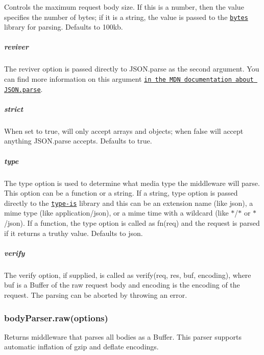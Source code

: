 Controls the maximum request body size. If this is a number, then the value specifies the number of bytes; if it is a string, the value is passed to the \href{https://www.npmjs.com/package/bytes}{\tt bytes} library for parsing. Defaults to {\ttfamily \textquotesingle{}100kb\textquotesingle{}}.

\subparagraph*{reviver}

The {\ttfamily reviver} option is passed directly to {\ttfamily J\+S\+O\+N.\+parse} as the second argument. You can find more information on this argument \href{https://developer.mozilla.org/en-US/docs/Web/JavaScript/Reference/Global_Objects/JSON/parse#Example.3A_Using_the_reviver_parameter}{\tt in the M\+D\+N documentation about J\+S\+O\+N.\+parse}.

\subparagraph*{strict}

When set to {\ttfamily true}, will only accept arrays and objects; when {\ttfamily false} will accept anything {\ttfamily J\+S\+O\+N.\+parse} accepts. Defaults to {\ttfamily true}.

\subparagraph*{type}

The {\ttfamily type} option is used to determine what media type the middleware will parse. This option can be a function or a string. If a string, {\ttfamily type} option is passed directly to the \href{https://www.npmjs.org/package/type-is#readme}{\tt type-\/is} library and this can be an extension name (like {\ttfamily json}), a mime type (like {\ttfamily application/json}), or a mime time with a wildcard (like {\ttfamily $\ast$/$\ast$} or {\ttfamily $\ast$/json}). If a function, the {\ttfamily type} option is called as {\ttfamily fn(req)} and the request is parsed if it returns a truthy value. Defaults to {\ttfamily json}.

\subparagraph*{verify}

The {\ttfamily verify} option, if supplied, is called as {\ttfamily verify(req, res, buf, encoding)}, where {\ttfamily buf} is a {\ttfamily Buffer} of the raw request body and {\ttfamily encoding} is the encoding of the request. The parsing can be aborted by throwing an error.

\subsubsection*{body\+Parser.\+raw(options)}

Returns middleware that parses all bodies as a {\ttfamily Buffer}. This parser supports automatic inflation of {\ttfamily gzip} and {\ttfamily deflate} encodings.

